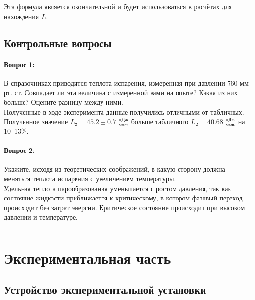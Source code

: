 \documentclass[a4paper,12pt]{article} %
\begin{document}
\noindent Эта формула является окончательной и будет использоваться в расчётах для нахождения $L$.

\subsection{Контрольные вопросы}

\paragraph{Вопрос 1:}
В справочниках приводится теплота испарения, измеренная при давлении 760 мм рт. ст. Совпадает ли эта величина с измеренной вами на опыте? Какая из них больше? Оцените разницу между ними.\\

Полученные в ходе эксперимента данные получились отличными от табличных. Полученное значение $L_2 = 45.2 \pm 0.7 \; \frac{\text{кДж}}{\text{моль}}$ больше табличного $L_2 = 40.68 \; \frac{\text{кДж}}{\text{моль}}$ на 10--13\%.

\paragraph{Вопрос 2:}
Укажите, исходя из теоретических соображений, в какую сторону должна меняться теплота испарения с увеличением температуры.\\

Удельная теплота парообразования уменьшается с ростом давления, так как состояние жидкости приближается к критическому, в котором фазовый переход происходит без затрат энергии. Критическое состояние происходит при высоком давлении и температуре.

\medskip\hrule\medskip

\section{Экспериментальная часть}

\subsection{Устройство экспериментальной установки}
\end{document}
